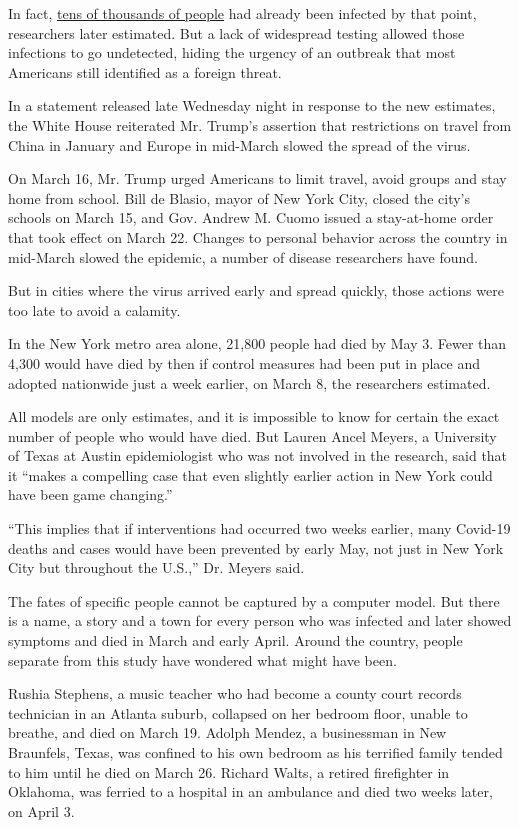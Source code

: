 In fact,
\href{https://www.nytimes.com/2020/04/23/us/coronavirus-early-outbreaks-cities.html}{tens
of thousands of people} had already been infected by that point,
researchers later estimated. But a lack of widespread testing allowed
those infections to go undetected, hiding the urgency of an outbreak
that most Americans still identified as a foreign threat.

In a statement released late Wednesday night in response to the new
estimates, the White House reiterated Mr. Trump's assertion that
restrictions on travel from China in January and Europe in mid-March
slowed the spread of the virus.

On March 16, Mr. Trump urged Americans to limit travel, avoid groups and
stay home from school. Bill de Blasio, mayor of New York City, closed
the city's schools on March 15, and Gov. Andrew M. Cuomo issued a
stay-at-home order that took effect on March 22. Changes to personal
behavior across the country in mid-March slowed the epidemic, a number
of disease researchers have found.

But in cities where the virus arrived early and spread quickly, those
actions were too late to avoid a calamity.

In the New York metro area alone, 21,800 people had died by May 3. Fewer
than 4,300 would have died by then if control measures had been put in
place and adopted nationwide just a week earlier, on March 8, the
researchers estimated.

All models are only estimates, and it is impossible to know for certain
the exact number of people who would have died. But Lauren Ancel Meyers,
a University of Texas at Austin epidemiologist who was not involved in
the research, said that it ``makes a compelling case that even slightly
earlier action in New York could have been game changing.''

``This implies that if interventions had occurred two weeks earlier,
many Covid-19 deaths and cases would have been prevented by early May,
not just in New York City but throughout the U.S.,'' Dr. Meyers said.

The fates of specific people cannot be captured by a computer model. But
there is a name, a story and a town for every person who was infected
and later showed symptoms and died in March and early April. Around the
country, people separate from this study have wondered what might have
been.

Rushia Stephens, a music teacher who had become a county court records
technician in an Atlanta suburb, collapsed on her bedroom floor, unable
to breathe, and died on March 19. Adolph Mendez, a businessman in New
Braunfels, Texas, was confined to his own bedroom as his terrified
family tended to him until he died on March 26. Richard Walts, a retired
firefighter in Oklahoma, was ferried to a hospital in an ambulance and
died two weeks later, on April 3.

